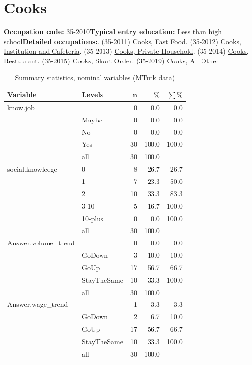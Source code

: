 \documentclass[a4paper,10pt]{article}\usepackage[]{graphicx}\usepackage[]{color}
\begin{document}
\newpage\section{Cooks}\textbf{Occupation code:} 35-2010\newline\textbf{Typical entry education:} Less than high school\newline\textbf{Detailed occupations:}. (35-2011)  \href{http://www.bls.gov/oes/current/oes352011.htm}{Cooks, Fast Food}. (35-2012)  \href{http://www.bls.gov/oes/current/oes352012.htm}{Cooks, Institution and Cafeteria}. (35-2013)  \href{http://www.bls.gov/oes/current/oes352013.htm}{Cooks, Private Household}. (35-2014)  \href{http://www.bls.gov/oes/current/oes352014.htm}{Cooks, Restaurant}. (35-2015)  \href{http://www.bls.gov/oes/current/oes352015.htm}{Cooks, Short Order}. (35-2019)  \href{http://www.bls.gov/oes/current/oes352019.htm}{Cooks, All Other}\newline%
\begin{table}[ht]
\centering
{\footnotesize
\begin{tabular}{ll|rrr}
 \textbf{Variable} & \textbf{Levels} & $\mathbf{n}$ & $\mathbf{\%}$ & $\mathbf{\sum \%}$ \\ 
  \hline
know.job &  & 0 & 0.0 & 0.0 \\ 
   & Maybe & 0 & 0.0 & 0.0 \\ 
   & No & 0 & 0.0 & 0.0 \\ 
   & Yes & 30 & 100.0 & 100.0 \\ 
   \hline
 & all & 30 & 100.0 &  \\ 
   \hline
\hline
social.knowledge & 0 & 8 & 26.7 & 26.7 \\ 
   & 1 & 7 & 23.3 & 50.0 \\ 
   & 2 & 10 & 33.3 & 83.3 \\ 
   & 3-10 & 5 & 16.7 & 100.0 \\ 
   & 10-plus & 0 & 0.0 & 100.0 \\ 
   \hline
 & all & 30 & 100.0 &  \\ 
   \hline
\hline
Answer.volume\_trend &  & 0 & 0.0 & 0.0 \\ 
   & GoDown & 3 & 10.0 & 10.0 \\ 
   & GoUp & 17 & 56.7 & 66.7 \\ 
   & StayTheSame & 10 & 33.3 & 100.0 \\ 
   \hline
 & all & 30 & 100.0 &  \\ 
   \hline
\hline
Answer.wage\_trend &  & 1 & 3.3 & 3.3 \\ 
   & GoDown & 2 & 6.7 & 10.0 \\ 
   & GoUp & 17 & 56.7 & 66.7 \\ 
   & StayTheSame & 10 & 33.3 & 100.0 \\ 
   \hline
 & all & 30 & 100.0 &  \\ 
   \hline
\hline
\end{tabular}
}
\caption{Summary statistics, nominal variables (MTurk data)} 
\label{tab1:35-2010}
\end{table}
\end{document}

